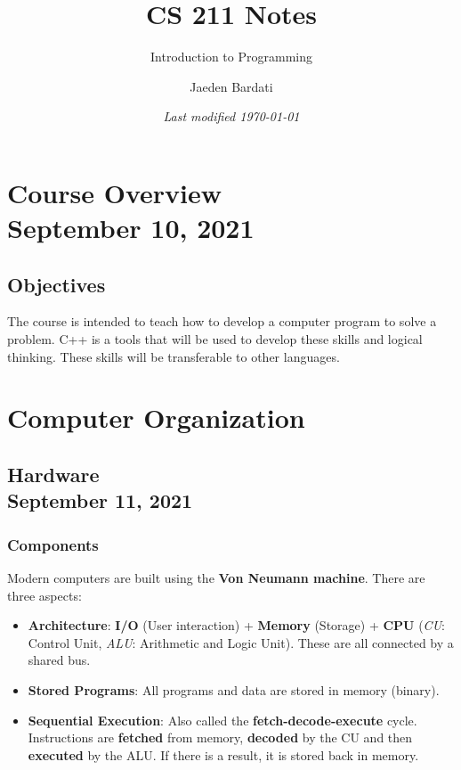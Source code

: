 \documentclass[]{article}
\title{\textbf{CS 211 Notes}}
\subtitle{Introduction to Programming}
\author{Jaeden Bardati}
\date{\textit{Last modified \today}}
\begin{document}
\maketitle
\bigbreak

\section{Course Overview\\ {\large \normalfont September 10, 2021}}
\bigbreak

\subsection{Objectives}
\bigbreak

The course is intended to teach how to develop a computer program to solve a problem. C++ is a tools that will be used to develop these skills and logical thinking. These skills will be transferable to other languages.

\section{Computer Organization}
\bigbreak

\subsection{Hardware\\ {\large \normalfont September 11, 2021}}
\bigbreak

\subsubsection{Components}
\bigbreak

Modern computers are built using the \textbf{Von Neumann machine}. There are three aspects:

\begin{itemize}
	\item \textbf{Architecture}: \textbf{I/O} (User interaction) + \textbf{Memory} (Storage) + \textbf{CPU} (\textit{CU}: Control Unit, \textit{ALU}: Arithmetic and Logic Unit). These are all connected by a shared bus.
	\item \textbf{Stored Programs}: All programs and data are stored in memory (binary).
	\item \textbf{Sequential Execution}: Also called the \textbf{fetch-decode-execute} cycle. Instructions are \textbf{fetched} from memory, \textbf{decoded} by the CU and then \textbf{executed} by the ALU. If there is a result, it is stored back in memory. \smallskip
\end{itemize}
\end{document}
